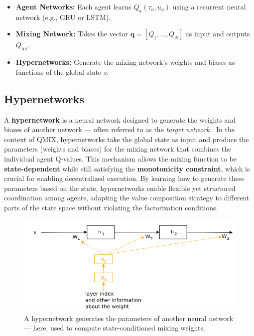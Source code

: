 \documentclass[../Main.tex]{subfiles}
\begin{document}
\begin{itemize}
    \item \textbf{Agent Networks:} Each agent learns \( Q_a(\tau_a, u_a) \) using a recurrent neural network (e.g., GRU or LSTM).
    \item \textbf{Mixing Network:} Takes the vector \( \mathbf{q} = [Q_1, \dots, Q_N] \) as input and outputs \( Q_{\text{tot}} \).
    \item \textbf{Hypernetworks:} Generate the mixing network’s weights and biases as functions of the global state \(s\).
\end{itemize}

\subsection{Hypernetworks}

A \textbf{hypernetwork} is a neural network designed to generate the weights and biases of another network — often referred to as the \emph{target network} \cite{ha2016hypernetworks}. In the context of QMIX, hypernetworks take the global state as input and produce the parameters (weights and biases) for the mixing network that combines the individual agent Q-values. This mechanism allows the mixing function to be \textbf{state-dependent} while still satisfying the \textbf{monotonicity constraint}, which is crucial for enabling decentralized execution. By learning how to generate these parameters based on the state, hypernetworks enable flexible yet structured coordination among agents, adapting the value composition strategy to different parts of the state space without violating the factorization conditions.

\begin{figure}[h]
    \centering
    \includegraphics[width=\linewidth]{img/hypernetwork.png}
    \caption{A hypernetwork generates the parameters of another neural network — here, used to compute state-conditioned mixing weights.}
\end{figure}
\end{document}
